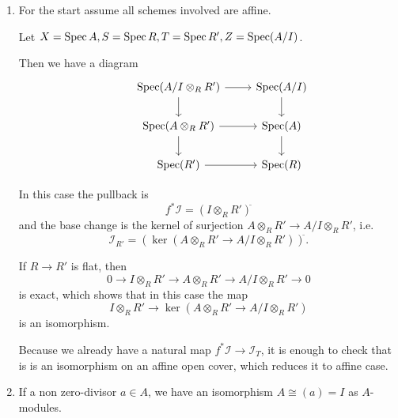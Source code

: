 \begin{exercise}{2}
    \begin{enumerate}
        \item{
                For the start assume all schemes involved are affine.

                Let $X = \operatorname{Spec} A, S = \operatorname{Spec} R, T = \operatorname{Spec} R', Z = \operatorname{Spec}(A /
                I)$.

                Then we have a diagram
                \begin{equation*}
                    \begin{tikzcd}
                        &\Spec(A / I \otimes_R R') \arrow{r} \arrow{d}
                        &\Spec(A / I) \arrow{d} \\
                        &\Spec(A \otimes_R R') \arrow{r} \arrow{d} &\Spec(A)
                        \arrow{d} \\
                        &\Spec(R') \arrow{r} &\Spec(R)
                    \end{tikzcd}
                \end{equation*}

                In this case the pullback is
                \begin{equation*}
                    f^* \mathcal{I} = (I \otimes_R R')^{\widetilde{}}
                \end{equation*}
                and the base change is the kernel of surjection $A \otimes_R R'
                \to A / I \otimes_R R'$, i.e.
                \begin{equation*}
                    \mathcal{I}_{R'} = (\ker(A \otimes_R R' \to A / I
                    \otimes_R R'))^{\widetilde{}}.
                \end{equation*}

                If $R \to R'$ is flat, then
                \begin{equation*}
                    0 \to I \otimes_R R' \to A \otimes_R R' \to A / I \otimes_R
                    R' \to 0
                \end{equation*}
                is exact, which shows that in this case the map
                \begin{equation*}
                    I \otimes_R R' \to \ker(A \otimes_R R' \to A / I \otimes_R R')
                \end{equation*}
                is an isomorphism.

                Because we already have a natural map $f^* \mathcal{I} \to
                \mathcal{I}_T$, it is enough to check that is is an isomorphism
                on an affine open cover, which reduces it to affine case.
            }
        \item{
                If a non zero-divisor $a \in A$, we have an isomorphism $A \cong
                (a) = I$ as $A$-modules.

}
\end{enumerate}
\end{exercise}
